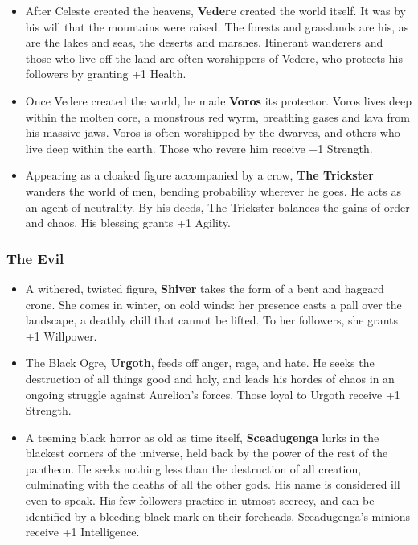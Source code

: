 \documentclass{article}
\begin{document}
\begin{itemize}
\item After Celeste created the heavens, {\bf Vedere} created the world 
itself.  It was by his will that the mountains were raised.  The forests 
and grasslands are his, as are the lakes and seas, the deserts and 
marshes.  Itinerant wanderers and those who live off the land are often 
worshippers of Vedere, who protects his followers by granting +1 Health.

\item Once Vedere created the world, he made {\bf Voros} its protector.  
Voros lives deep within the molten core, a monstrous red wyrm, breathing 
gases and lava from his massive jaws.  Voros is often worshipped by the 
dwarves, and others who live deep within the earth.  Those who revere him 
receive +1 Strength.

\item Appearing as a cloaked figure accompanied by a crow, 
{\bf The Trickster} wanders the world of men, bending probability wherever 
he goes.  He acts as an agent of neutrality.  By his deeds, The Trickster 
balances the gains of order and chaos.  His blessing grants +1 Agility.
\end{itemize}

\subsubsection{The Evil}

\begin{itemize}
\item A withered, twisted figure, {\bf Shiver} takes the form of a bent and
haggard crone.  She comes in winter, on cold winds: her presence casts a 
pall over the landscape, a deathly chill that cannot be lifted.  To her 
followers, she grants +1 Willpower. 

\item The Black Ogre, {\bf Urgoth}, feeds off anger, rage, and hate.  He 
seeks the destruction of all things good and holy, and leads his hordes of 
chaos in an ongoing struggle against Aurelion's forces.  Those loyal to 
Urgoth receive +1 Strength.

\item A teeming black horror as old as time itself, {\bf Sceadugenga} lurks
in the blackest corners of the universe, held back by the power of the rest
of the pantheon.  He seeks nothing less than the destruction of all 
creation, culminating with the deaths of all the other gods.  His name is 
considered ill even to speak.  His few followers practice in utmost 
secrecy, and can be identified by a bleeding black mark on their 
foreheads.  Sceadugenga's minions receive +1 Intelligence.

\end{itemize}
\end{document}
